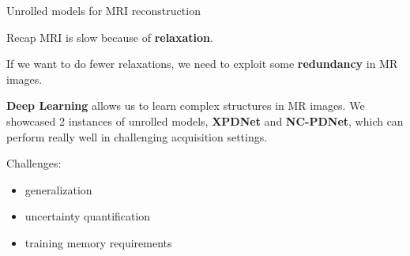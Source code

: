 \begin{frame}
\begin{figure}
    \end{figure}

\end{frame}

\begin{frame}{Unrolled models for MRI reconstruction}
    \begin{block}{Recap}
        MRI is slow because of \textbf{relaxation}.

        \pause
        If we want to do fewer relaxations, we need to exploit some \textbf{redundancy} in MR images.

        \pause
        \textbf{Deep Learning} allows us to learn complex structures in MR images.
        We showcased 2 instances of unrolled models, \textbf{XPDNet} and \textbf{NC-PDNet}, which can perform really well in challenging acquisition settings.
    \end{block}

    \pause
    Challenges:
    \begin{itemize}
        \item generalization
        \item uncertainty quantification
        \item training memory requirements
    \end{itemize}
\end{frame}
